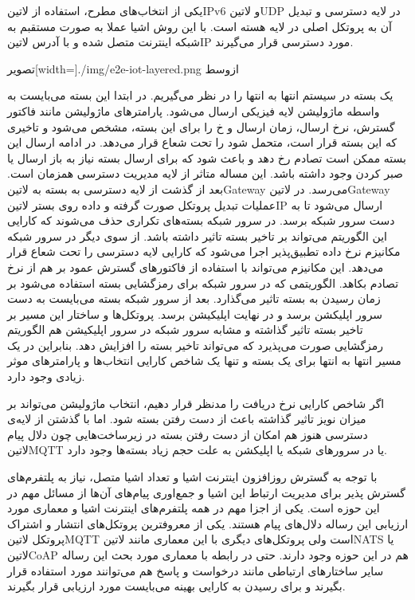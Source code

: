 یکی از انتخاب‌های مطرح، استفاده از ‌لاتین{IPv6} و ‌لاتین{UDP} در لایه دسترسی و تبدیل آن به پروتکل اصلی در لایه هسته است. با این روش
اشیا عملا به صورت مستقبم به شبکه اینترنت متصل شده و با آدرس ‌لاتین{IP} مورد دسترسی قرار می‌گیرند.

‌تصویر[width=\textwidth]{./img/e2e-iot-layered.png}
‌ازوسط


یک بسته در سیستم انتها به انتها را در نظر می‌گیریم. در ابتدا این بسته می‌بایست به واسطه ماژولیشن لایه فیزیکی ارسال می‌شود.
پارامترهای ماژولیشن مانند فاکتور گسترش، نرخ ارسال، زمان ارسال و ‌خ را برای این بسته، مشخص می‌شود و تاخیری که این بسته قرار است،
متحمل شود را تحت شعاع قرار می‌دهد. در ادامه ارسال این بسته ممکن است تصادم رخ دهد و باعث شود که برای ارسال بسته نیاز به باز ارسال
یا صبر کردن وجود داشته باشد. این مساله متاثر از لایه مدیریت دسترسی همزمان است. بعد از گذشت از لایه دسترسی به بسته به ‌لاتین{Gateway}
می‌رسد.
در ‌لاتین{Gateway} عملیات تبدیل پروتکل صورت گرفته و داده روی بستر ‌لاتین{IP} ارسال می‌شود تا به دست سرور شبکه برسد.
در سرور شبکه بسته‌های تکراری حذف می‌شوند که کارایی این الگوریتم می‌تواند بر تاخیر بسته تاثیر داشته باشد. از سوی دیگر در سرور شبکه
مکانیزم نرخ داده تطبیق‌پذیر اجرا می‌شود که کارایی لایه دسترسی را تحت شعاع قرار می‌دهد. این مکانیزم می‌تواند با استفاده از فاکتورهای گسترش عمود بر هم
از نرخ تصادم بکاهد. الگوریتمی که در سرور شبکه برای رمزگشایی بسته استفاده می‌شود بر زمان رسیدن به بسته تاثیر می‌گذارد.
بعد از سرور شبکه بسته می‌بایست به دست سرور اپلیکشن برسد و در نهایت اپلیکیشن برسد. پروتکل‌ها و ساختار این مسیر بر تاخیر بسته تاثیر گذاشته
و مشابه سرور شبکه در سرور اپلیکیشن هم الگوریتم رمزگشایی صورت می‌پذیرد که می‌تواند تاخیر بسته را افزایش دهد.
بنابراین در یک مسیر انتها به انتها برای یک بسته و تنها یک شاخص کارایی انتخاب‌ها و پارامترهای موثر زیادی وجود دارد.

اگر شاخص کارایی نرخ دریافت را مدنظر قرار دهیم، انتخاب ماژولیشن می‌تواند بر میزان نویز تاثیر گذاشته باعث از دست رفتن بسته شود.
اما با گذشتن از لایه‌ی دسترسی هنوز هم امکان از دست رفتن بسته در زیرساخت‌هایی چون دلال پیام ‌لاتین{MQTT} یا در سرورهای
شبکه یا اپلیکشن به علت حجم زیاد بسته‌ها وجود دارد.


با توجه به گسترش روزافزون اینترنت اشیا و تعداد اشیا متصل، نیاز به پلتفرم‌های گسترش پذیر برای مدیریت ارتباط این اشیا و جمع‌اوری پیام‌های آن‌ها
از مسائل مهم در این حوزه است. یکی از اجزا مهم در همه پلتفرم‌های اینترنت اشیا و معماری مورد ارزیابی این رساله دلال‌های پیام هستند. یکی از
معروفترین پروتکل‌های انتشار و اشتراک پروتکل ‌لاتین{MQTT} است ولی پروتکل‌های دیگری با این معماری مانند ‌لاتین{NATS} یا
‌لاتین{CoAP} هم در این حوزه وجود دارند. حتی در رابطه با معماری مورد بحث این رساله سایر ساختارهای ارتباطی مانند درخواست و پاسخ
هم می‌توانند مورد استفاده قرار بگیرند و برای رسیدن به کارایی بهینه می‌بایست مورد ارزیابی قرار بگیرند.

